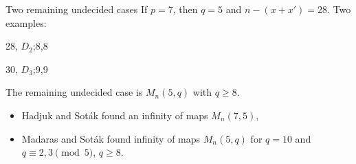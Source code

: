 \documentclass[%
pdf,
colorBG,
slideColor,
]{prosper}
\begin{document}
\begin{slide}{Two remaining undecided cases}
\vspace{-3.5mm}
If $p=7$, then $q=5$ and $n-(x+x')=28$. Two examples:
\begin{center}
\begin{minipage}{5cm}
\centering
{}\par
28, $D_2$;8,8
\end{minipage}
\begin{minipage}{5cm}
\centering
{}\par
30, $D_3$;9,9
\end{minipage}
\end{center}

The remaining undecided case is $M_n(5,q)$ with $q\geq 8$.

\begin{itemize}
\item Hadjuk and Sot\'ak found an infinity of maps $M_n(7,5)$,
\item Madaras and Sot\'ak found infinity of maps $M_n(5,q)$ for $q=10$ and $q\equiv 2,3\pmod 5$, $q\geq 8$.
\end{itemize}


\end{slide}
\end{document}
